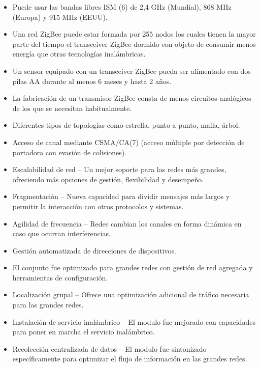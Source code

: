 \begin{itemize}
    \item Puede usar las bandas libres ISM (6) de 2,4 GHz (Mundial), 868 MHz (Europa) y 915 MHz (EEUU).
    \item  Una red ZigBee puede estar formada por 255 nodos los cuales tienen la mayor parte del tiempo el transceiver ZigBee dormido con objeto de consumir menos energía que otras tecnologías inalámbricas.
    \item Un sensor equipado con un transceiver ZigBee pueda ser alimentado con dos pilas AA durante al menos 6 meses y hasta 2 años.
    \item La fabricación de un transmisor ZigBee consta de menos circuitos analógicos de los que se necesitan habitualmente.
    \item  Diferentes tipos de topologías como estrella, punto a punto, malla, árbol.
    \item Acceso de canal mediante CSMA/CA(7) (acceso múltiple por detección de portadora con evasión de colisiones).
    \item Escalabilidad de red -- Un mejor soporte para las redes más grandes, ofreciendo más opciones de gestión, flexibilidad y desempeño.
    \item  Fragmentación -- Nueva capacidad para dividir mensajes más largos y permitir la interacción con otros protocolos y sistemas.
    \item  Agilidad de frecuencia -- Redes cambian los canales en forma dinámica en caso que ocurran interferencias.
    \item Gestión automatizada de direcciones de dispositivos.
    \item  El conjunto fue optimizado para grandes redes con gestión de red agregada y herramientas de configuración.
    \item Localización grupal -- Ofrece una optimización adicional de tráfico necesaria para las grandes redes.
    \item  Instalación de servicio inalámbrico -- El modulo fue mejorado con capacidades para poner en marcha el servicio inalámbrico.
    \item Recolección centralizada de datos -- El modulo fue sintonizado específicamente para optimizar el flujo de información en las grandes redes.    
\end{itemize}
    
